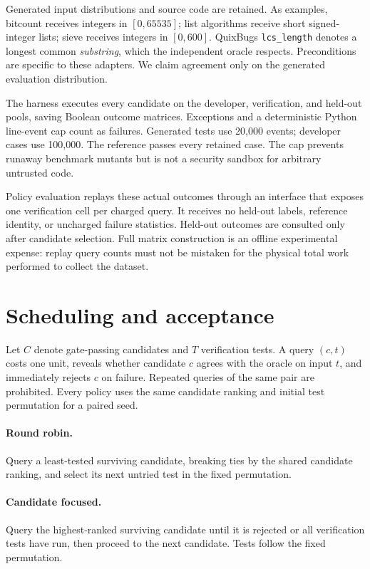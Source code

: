 \documentclass[10pt]{article}
\begin{document}
Generated input distributions and source code are retained. As examples, bitcount receives integers in $[0,65535]$; list algorithms receive short signed-integer lists; sieve receives integers in $[0,600]$. QuixBugs \texttt{lcs\_length} denotes a longest common \emph{substring}, which the independent oracle respects. Preconditions are specific to these adapters. We claim agreement only on the generated evaluation distribution.

The harness executes every candidate on the developer, verification, and held-out pools, saving Boolean outcome matrices. Exceptions and a deterministic Python line-event cap count as failures. Generated tests use 20,000 events; developer cases use 100,000. The reference passes every retained case. The cap prevents runaway benchmark mutants but is not a security sandbox for arbitrary untrusted code.

Policy evaluation replays these actual outcomes through an interface that exposes one verification cell per charged query. It receives no held-out labels, reference identity, or uncharged failure statistics. Held-out outcomes are consulted only after candidate selection. Full matrix construction is an offline experimental expense: replay query counts must not be mistaken for the physical total work performed to collect the dataset.

\section{Scheduling and acceptance}
Let $C$ denote gate-passing candidates and $T$ verification tests. A query $(c,t)$ costs one unit, reveals whether candidate $c$ agrees with the oracle on input $t$, and immediately rejects $c$ on failure. Repeated queries of the same pair are prohibited. Every policy uses the same candidate ranking and initial test permutation for a paired seed.

\paragraph{Round robin.} Query a least-tested surviving candidate, breaking ties by the shared candidate ranking, and select its next untried test in the fixed permutation.
\paragraph{Candidate focused.} Query the highest-ranked surviving candidate until it is rejected or all verification tests have run, then proceed to the next candidate. Tests follow the fixed permutation.
\end{document}
